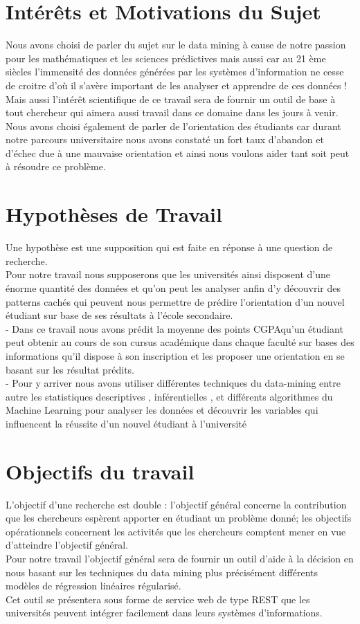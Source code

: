 \section{Intérêts et Motivations du Sujet}
Nous avons choisi de parler du sujet sur le data mining à cause de notre passion pour les mathématiques et les sciences prédictives mais aussi car au 21 ème siècles l'immensité des données générées par les systèmes d'information ne cesse de croitre d'où il s'avère important de les analyser et apprendre de ces données !\\
Mais aussi l'intérêt scientifique de ce travail sera de fournir un outil de base à tout chercheur qui aimera aussi travail dans ce domaine dans les jours à venir. \\
Nous avons choisi également de parler de l'orientation des étudiants car durant notre parcours universitaire nous avons constaté un fort taux d'abandon et d'échec due à une mauvaise orientation et ainsi nous voulons aider tant soit peut à résoudre ce problème. 
\section{Hypothèses de Travail}
Une hypothèse est  une supposition qui est faite en réponse à une question de recherche. \cite{MethFr} \\
Pour notre travail nous supposerons que les universités ainsi disposent d'une énorme quantité des données et qu'on peut les analyser anfin d'y découvrir des patterns cachés qui peuvent nous permettre de prédire l'orientation d'un nouvel étudiant sur base de ses résultats à l'école secondaire.  \\
- Dans ce travail nous avons prédit la moyenne des points \ac{CGPA}qu'un étudiant peut obtenir au cours de son cursus académique  dans chaque faculté sur bases des informations qu'il dispose à son inscription et les proposer une orientation en se basant sur les résultat prédits. \\
- Pour y arriver nous avons utiliser différentes techniques du data-mining entre autre les statistiques descriptives , inférentielles , et différents algorithmes du Machine Learning pour analyser les données et découvrir les variables qui influencent la réussite d'un nouvel étudiant à l'université
\section{Objectifs du travail}
L'objectif d’une recherche est double : l'objectif général concerne la contribution que les chercheurs espèrent apporter en étudiant un problème donné; les objectifs opérationnels concernent les activités que les chercheurs comptent mener en vue
d'atteindre l'objectif général. \cite{MethFr} \\
Pour notre travail l'objectif général sera de fournir un outil d'aide à la décision en nous basant sur les techniques du data mining plus précisément différents modèles de régression linéaires régularisé. \\
Cet outil se présentera sous forme de service web de type \ac{REST} que les universités peuvent intégrer facilement dans leurs systèmes d'informations.
